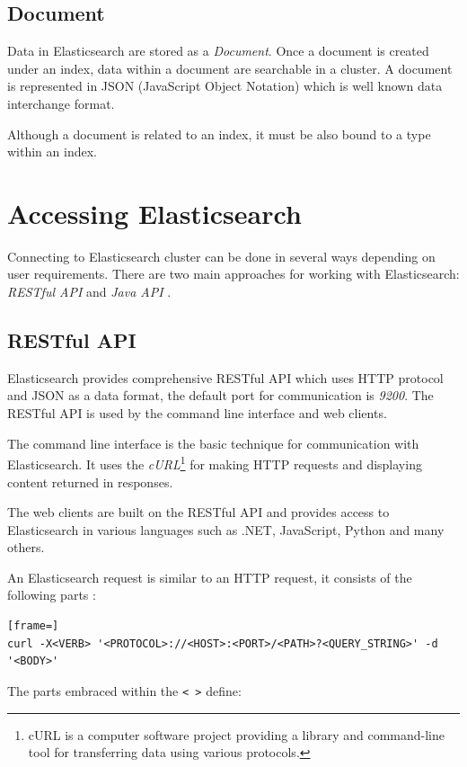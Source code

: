 \documentclass[12pt,oneside]{fithesis2}
\begin{document}
\subsection{Document}
Data in Elasticsearch are stored as a \textit{Document}. Once a document is created under an index, data within a document are searchable in a cluster. A document is represented in JSON (JavaScript Object Notation) which is well known data interchange format.

Although a document is related to an index, it must be also bound to a type within an index.

\section{Accessing Elasticsearch}
Connecting to Elasticsearch cluster can be done in several ways depending on user requirements. There are two main approaches for working with Elasticsearch: \textit{RESTful API} and \textit{Java API} \cite[Talking to Elasticsearch]{elasticsearch_defnitive_guide}.

\subsection{RESTful API}
Elasticsearch provides comprehensive RESTful API which uses HTTP protocol and JSON as a data format, the default port for communication is \textit{9200}. The RESTful API is used by the command line interface and web clients.

The command line interface is the basic technique for communication with Elasticsearch. It uses the \textit{cURL}\footnote{cURL is a computer software project providing a library and command-line tool for transferring data using various protocols.} for making HTTP requests and displaying content returned in responses.

The web clients are built on the RESTful API and provides access to Elasticsearch in various languages such as .NET, JavaScript, Python and many others.

An Elasticsearch request is similar to an HTTP request, it consists of the following parts \cite[Talking to Elasticsearch]{elasticsearch_defnitive_guide}:

\begin{lstlisting}[frame=]
curl -X<VERB> '<PROTOCOL>://<HOST>:<PORT>/<PATH>?<QUERY_STRING>' -d '<BODY>'
\end{lstlisting}

The parts embraced within the \verb|< >| define:
\end{document}

